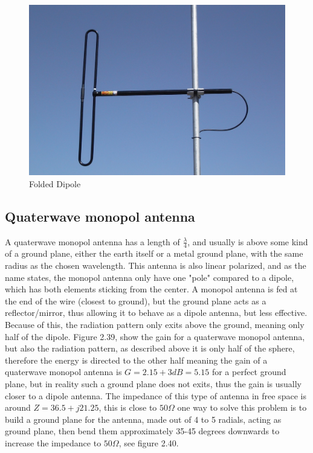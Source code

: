 \begin{figure}[h]
\centering
\includegraphics[scale=0.9]{figures/FoldedDipole.jpg}
\caption{Folded Dipole}
\end{figure}

\subsection{Quaterwave monopol antenna}
A quaterwave monopol antenna has a length of $\frac{\lambda}{4}$, and usually is above some kind of a ground plane, either the earth itself or a metal ground plane, with the same radius as the chosen wavelength. This antenna is also linear polarized, and as the name states, the monopol antenna only have one "pole" compared to a dipole, which has both elements sticking from the center. A monopol antenna is fed at the end of the wire (closest to ground), but the ground plane acts as a reflector/mirror, thus allowing it to behave as a dipole antenna, but less effective. Because of this, the radiation pattern only exits above the ground, meaning only half of the dipole. Figure 2.39, show the gain for a quaterwave monopol antenna, but also the radiation pattern, as described above it is only half of the sphere, therefore the energy is directed to the other half meaning the gain of a quaterwave monopol antenna is $G=2.15+3dB=5.15$ for a perfect ground plane, but in reality such a ground plane does not exits, thus the gain is usually closer to a dipole antenna. The impedance of this type of antenna in free space is around $Z=36.5+j21.25$\cite{ImpedanceMonopol}, this is close to $50\Omega$ one way to solve this problem is to build a ground plane for the antenna, made out of 4 to 5 radials, acting as ground plane, then bend them approximately 35-45 degrees downwards to increase the impedance to $50\Omega$, see figure 2.40. 


